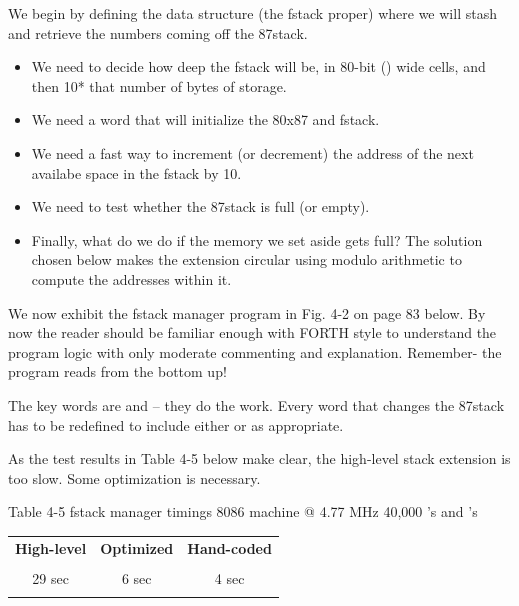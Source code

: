 We begin by defining the data structure (the fstack proper) where we will stash and retrieve the numbers coming off the 87stack.

\begin{itemize}
    \item We need to decide how deep the fstack will be, in 80-bit () wide cells, and then  10* that number of bytes of storage.
    \item We need a word that will initialize the 80x87 and fstack.
    \item We need a fast way to increment (or decrement) the address of the next availabe space in the fstack by 10.
    \item We need to test whether the 87stack is full (or empty).
    \item Finally, what do we do if the memory we set aside gets full? The solution chosen below makes the extension circular using modulo arithmetic to compute the addresses within it.
\end{itemize}

We now exhibit the fstack manager program in Fig. 4-2 on page 83 below. By now the reader should be familiar enough with FORTH style to understand the program logic with only moderate commenting and explanation. Remember- the program reads from the bottom up!

The key words are  and -- they do the work. Every word that changes the 87stack has to be redefined to include either  or  as appropriate.

As the test results in Table 4-5 below make clear, the high-level stack extension is too slow. Some optimization is necessary.

Table 4-5 fstack manager timings
8086 machine @ 4.77 MHz
40,000 's and 's
\begin{center}
    \begin{tabular}{|c c c|}
    \hline
        \textbf{High-level} & \textbf{Optimized} & \textbf{Hand-coded} \\
                            &                    &                     \\
        29 sec              & 6 sec              & 4 sec               \\
                            &                    &                     \\
    \hline
    \end{tabular}
\end{center}

